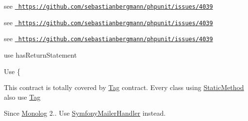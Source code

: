 \begin{DoxyRefList}
%
see \href{https://github.com/sebastianbergmann/phpunit/issues/4039}{\texttt{ https\+://github.\+com/sebastianbergmann/phpunit/issues/4039}}  
\item[Global \mbox{\hyperlink{class_p_h_p_unit_1_1_text_u_i_1_1_xml_configuration_1_1_p_h_p_unit_aaf7a92d6be005f7925e25ee41323434f}{PHPUnit\+::test\+Suite\+Loader\+Class}} ()]\label{deprecated__deprecated000068}%
%
see \href{https://github.com/sebastianbergmann/phpunit/issues/4039}{\texttt{ https\+://github.\+com/sebastianbergmann/phpunit/issues/4039}}  
\item[Global \mbox{\hyperlink{class_p_h_p_unit_1_1_text_u_i_1_1_xml_configuration_1_1_p_h_p_unit_abbfe6362b8695bd7cd254e3117976ad6}{PHPUnit\+::test\+Suite\+Loader\+File}} ()]\label{deprecated__deprecated000070}%
%
see \href{https://github.com/sebastianbergmann/phpunit/issues/4039}{\texttt{ https\+://github.\+com/sebastianbergmann/phpunit/issues/4039}}  
\item[Global \mbox{\hyperlink{class_prophecy_1_1_doubler_1_1_generator_1_1_node_1_1_return_type_node_a47ab359be614c67ac2607fa9869deed3}{Return\+Type\+Node\+::is\+Void}} ()]\label{deprecated__deprecated000022}%
%
use has\+Return\+Statement  
\item[Class \mbox{\hyperlink{class_deep_copy_1_1_type_filter_1_1_spl_1_1_spl_doubly_linked_list}{Spl\+Doubly\+Linked\+List}} ]\label{deprecated__deprecated000007}%
%
Use \{ 
\item[Class \mbox{\hyperlink{interfacephp_documentor_1_1_reflection_1_1_doc_block_1_1_tags_1_1_factory_1_1_static_method}{Static\+Method}} ]\label{deprecated__deprecated000012}%
%
This contract is totally covered by \mbox{\hyperlink{interfacephp_documentor_1_1_reflection_1_1_doc_block_1_1_tag}{Tag}} contract. Every class using \mbox{\hyperlink{interfacephp_documentor_1_1_reflection_1_1_doc_block_1_1_tags_1_1_factory_1_1_static_method}{Static\+Method}} also use \mbox{\hyperlink{interfacephp_documentor_1_1_reflection_1_1_doc_block_1_1_tag}{Tag}}  
\item[Class \mbox{\hyperlink{class_monolog_1_1_handler_1_1_swift_mailer_handler}{Swift\+Mailer\+Handler}} ]\label{deprecated__deprecated000005}%
%
Since \mbox{\hyperlink{namespace_monolog}{Monolog}} 2.. Use \mbox{\hyperlink{class_monolog_1_1_handler_1_1_symfony_mailer_handler}{Symfony\+Mailer\+Handler}} instead.  

\end{DoxyRefList}

